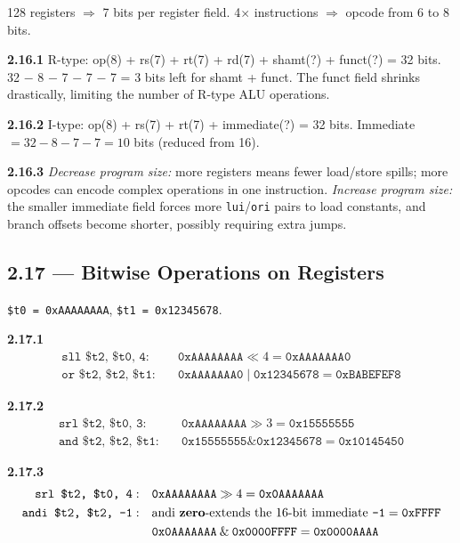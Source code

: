 128 registers $\Rightarrow$ 7 bits per register field.
4$\times$ instructions $\Rightarrow$ opcode from 6 to 8 bits.

\noindent\textbf{2.16.1} R-type: op(8) + rs(7) + rt(7) + rd(7) + shamt(?)
+ funct(?) = 32 bits. 32 $-$ 8 $-$ 7 $-$ 7 $-$ 7 = 3 bits left for
shamt + funct. The funct field shrinks drastically, limiting the number of
R-type ALU operations.

\noindent\textbf{2.16.2} I-type: op(8) + rs(7) + rt(7) + immediate(?)
= 32 bits. Immediate $= 32 - 8 - 7 - 7 = 10$ bits (reduced from 16).

\noindent\textbf{2.16.3}
\textit{Decrease program size:} more registers means fewer load/store
spills; more opcodes can encode complex operations in one instruction.
\textit{Increase program size:} the smaller immediate field forces more
\texttt{lui}/\texttt{ori} pairs to load constants, and branch offsets become
shorter, possibly requiring extra jumps.

\subsection*{2.17 --- Bitwise Operations on Registers}
\hypertarget{sol-2.17}{}

\texttt{\$t0 = 0xAAAAAAAA}, \texttt{\$t1 = 0x12345678}.

\noindent\textbf{2.17.1}
\begin{align*}
  \texttt{sll \$t2, \$t0, 4}: &\quad \texttt{0xAAAAAAAA} \ll 4
    = \texttt{0xAAAAAAA0} \\
  \texttt{or  \$t2, \$t2, \$t1}: &\quad \texttt{0xAAAAAAA0}
    \mid \texttt{0x12345678} = \texttt{0xBABEFEF8}
\end{align*}

\noindent\textbf{2.17.2}
\begin{align*}
  \texttt{srl \$t2, \$t0, 3}: &\quad \texttt{0xAAAAAAAA} \gg 3
    = \texttt{0x15555555} \\
  \texttt{and \$t2, \$t2, \$t1}: &\quad \texttt{0x15555555}
    \mathbin{\&} \texttt{0x12345678} = \texttt{0x10145450}
\end{align*}

\noindent\textbf{2.17.3}
\begin{align*}
  \texttt{srl \$t2, \$t0, 4}: &\quad \texttt{0xAAAAAAAA} \gg 4
    = \texttt{0x0AAAAAAA} \\
  \texttt{andi \$t2, \$t2, -1}: &\quad \text{andi \textbf{zero}-extends the
    16-bit immediate } \texttt{-1} = \texttt{0xFFFF} \\
  &\quad \texttt{0x0AAAAAAA} \mathbin{\&} \texttt{0x0000FFFF}
    = \texttt{0x0000AAAA}
\end{align*}

